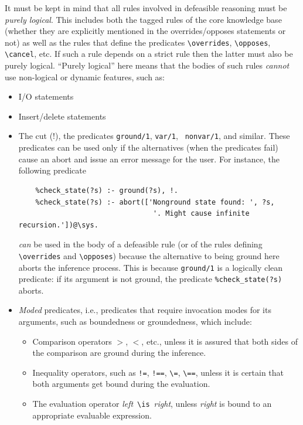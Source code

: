 \documentclass[11pt]{article}
\newcommand{\bs}{\textbackslash}
\begin{document}
It must be kept in mind that all rules involved in defeasible reasoning
must be \emph{purely logical}.
This includes both the tagged rules of the
core knowledge base (whether they are explicitly mentioned in the
overrides/opposes statements or not) as well as the rules that define the
predicates {\tt \bs{}overrides}, {\tt \bs{}opposes}, \texttt{\bs{}cancel},
etc.
If such a rule depends on a strict
rule then the latter must also be purely logical.
``Purely logical'' here means that the
bodies of such rules \emph{cannot} use non-logical or dynamic features,
such as:
\begin{itemize}
\item  I/O statements
\item  Insert/delete statements
\item  The cut (!), the predicates {\tt ground/1}, {\tt var/1}, {\tt
    nonvar/1}, and similar.
  These predicates can be used only if the alternatives (when
  the predicates fail) cause an abort and issue an error message for the user.
  For instance, the following predicate
\begin{verbatim}
    %check_state(?s) :- ground(?s), !.
    %check_state(?s) :- abort(['Nonground state found: ', ?s,
                                '. Might cause infinite recursion.'])@\sys.  
\end{verbatim}
  \emph{can} be used in the body of a defeasible rule (or of the rules defining
  {\tt \bs{}overrides} and {\tt \bs{}opposes}) because the alternative to being
  ground here aborts the inference process.
  This is because \texttt{ground/1} is a logically clean predicate: if its
  argument is not ground, the predicate \texttt{\%check\_state(?s)} aborts.  
\item \emph{Moded} predicates, i.e.,
  predicates that require invocation modes for its arguments, such as
  boundedness or groundedness, which include:
  \begin{itemize}
  \item  Comparison operators $>$, $<$, etc.,
    unless it is assured that both sides of the
    comparison are ground during the inference.
  \item  Inequality operators, such as {\tt !=}, {\tt !==}, \verb|\=|,
    \verb|\==|,  unless it is certain that both arguments get bound during
    the evaluation.
  \item  The evaluation operator \emph{left}~\texttt{\bs{}is}~\emph{right},
    unless \emph{right} is bound to an appropriate evaluable expression.  
  \end{itemize}

\end{itemize}
\end{document}

